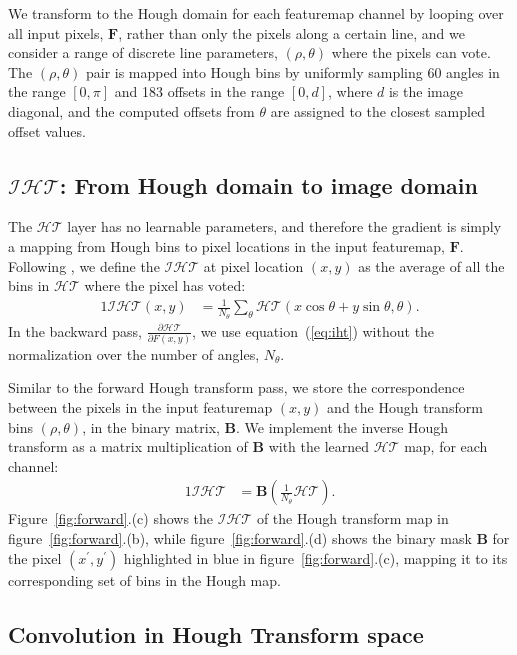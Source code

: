 \documentclass[runningheads]{llncs}
\begin{document}
We transform to the Hough domain for each featuremap channel by looping over all input pixels, $\mathbf{F}$, rather than only the pixels along a certain line, and we consider a range of discrete line parameters, $(\rho, \theta)$ where the pixels can vote. 
The $(\rho, \theta)$ pair is mapped into Hough bins by uniformly sampling $60$ angles in the range $[0,\pi]$ and 183 offsets in the range $[0,d]$, where $d$ is the image diagonal, and the computed offsets from $\theta$ are assigned to the closest sampled offset values. 

\subsection{$\mathcal{IHT}$: From Hough domain to image domain}

The $\mathcal{HT}$ layer has no learnable parameters, and therefore the gradient is simply a mapping from Hough bins to pixel locations in the input featuremap, $\mathbf{F}$. Following \cite{beatty2012radon}, we define the $\mathcal{IHT}$ at pixel location $(x,y)$ as the average of all the bins in $\mathcal{HT}$ where the pixel has voted:
\begin{alignat}{1}
    \mathcal{IHT}(x,y) &= \frac{1}{N_\theta}\sum_\theta \mathcal{HT}(x \cos \theta + y \sin \theta, \theta).
    \label{eq:iht}
\end{alignat} 
In the backward pass, $\frac{\partial \mathcal{HT}}{\partial F(x,y)}$, we use equation~(\ref{eq:iht}) without the normalization over the number of angles, $N_\theta$. 

Similar to the forward Hough transform pass, we store the correspondence between the pixels in the input featuremap $(x,y)$ and the Hough transform bins $(\rho, \theta)$, in the binary matrix, $\mathbf{B}$. 
We implement the inverse Hough transform as a matrix multiplication of $\mathbf{B}$ with the learned $\mathcal{HT}$ map, for each channel:
\begin{alignat}{1}
    \mathcal{IHT} &= \mathbf{B} \left( \frac{1}{N_\theta} \mathcal{HT} \right).
\end{alignat}
Figure~\ref{fig:forward}.(c) shows the $\mathcal{IHT}$ of the Hough transform map 
in figure~\ref{fig:forward}.(b), while figure~\ref{fig:forward}.(d) shows the binary mask $\mathbf{B}$ for the pixel $(x^\prime,y^\prime)$ highlighted in blue in figure~\ref{fig:forward}.(c), mapping it to its corresponding set of bins in the Hough map. 
\subsection{Convolution in Hough Transform space}
\label{section:Convolution in Hough Transform space}
\end{document}
